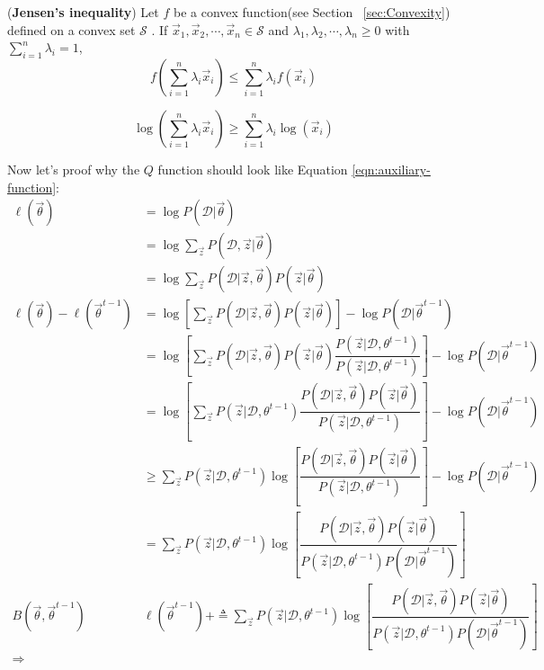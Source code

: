 \begin{theorem}
(\textbf{Jensen's inequality}) Let $f$ be a convex function(see Section ~\ref{sec:Convexity}) defined on a convex set $\mathcal{S}$ . If $\vec{x}_1, \vec{x}_2, \cdots , \vec{x}_n \in \mathcal{S}$ and $\lambda_1, \lambda_2, \cdots , \lambda_n \geq 0$ with $\sum\limits_{i=1}^n \lambda_i=1$,
\begin{equation}
f\left(\sum\limits_{i=1}^n \lambda_i\vec{x}_i\right) \leq \sum\limits_{i=1}^n {\lambda_i f(\vec{x}_i)}
\end{equation}
\end{theorem}

\begin{proposition}
\begin{equation}
\log\left(\sum\limits_{i=1}^n \lambda_i\vec{x}_i\right) \geq \sum\limits_{i=1}^n {\lambda_i \log(\vec{x}_i)}
\end{equation}
\end{proposition}

Now let's proof why the $Q$ function should look like Equation \eqref{eqn:auxiliary-function}:
\begin{align}
\ell(\vec{\theta}) &= \log{P(\mathcal{D}|\vec{\theta})}  \nonumber \\
                &= \log{{\sum\limits_{\vec{z}} P(\mathcal{D},\vec{z}|\vec{\theta})}} \nonumber \\
				&= \log{{\sum\limits_{\vec{z}} P(\mathcal{D}|\vec{z},\vec{\theta})P(\vec{z}|\vec{\theta})}} \nonumber \\
\ell(\vec{\theta})-\ell(\vec{\theta}^{t-1}) &= \log\left[\sum\limits_{\vec{z}} P(\mathcal{D}|\vec{z},\vec{\theta})P(\vec{z}|\vec{\theta})\right] - \log{P(\mathcal{D}|\vec{\theta}^{t-1})} \nonumber \\
                &= \log\left[\sum\limits_{\vec{z}} P(\mathcal{D}|\vec{z},\vec{\theta})P(\vec{z}|\vec{\theta})\dfrac{P(\vec{z}|\mathcal{D},\theta^{t-1})}{P(\vec{z}|\mathcal{D},\theta^{t-1})}\right] - \log{P(\mathcal{D}|\vec{\theta}^{t-1})} \nonumber \\
				&= \log\left[\sum\limits_{\vec{z}} P(\vec{z}|\mathcal{D},\theta^{t-1})\dfrac{P(\mathcal{D}|\vec{z},\vec{\theta})P(\vec{z}|\vec{\theta})}{P(\vec{z}|\mathcal{D},\theta^{t-1})}\right] - \log{P(\mathcal{D}|\vec{\theta}^{t-1})} \nonumber \\
				&\geq \sum\limits_{\vec{z}} P(\vec{z}|\mathcal{D},\theta^{t-1})\log\left[\dfrac{P(\mathcal{D}|\vec{z},\vec{\theta})P(\vec{z}|\vec{\theta})}{P(\vec{z}|\mathcal{D},\theta^{t-1})}\right] - \log{P(\mathcal{D}|\vec{\theta}^{t-1})} \nonumber \\
				&= \sum\limits_{\vec{z}} P(\vec{z}|\mathcal{D},\theta^{t-1})\log\left[\dfrac{P(\mathcal{D}|\vec{z},\vec{\theta})P(\vec{z}|\vec{\theta})}{P(\vec{z}|\mathcal{D},\theta^{t-1})P(\mathcal{D}|\vec{\theta}^{t-1})}\right] \nonumber \\
				B(\vec{\theta},\vec{\theta}^{t-1}) & \ell(\vec{\theta}^{t-1})+\triangleq \sum\limits_{\vec{z}} P(\vec{z}|\mathcal{D},\theta^{t-1})\log\left[\dfrac{P(\mathcal{D}|\vec{z},\vec{\theta})P(\vec{z}|\vec{\theta})}{P(\vec{z}|\mathcal{D},\theta^{t-1})P(\mathcal{D}|\vec{\theta}^{t-1})}\right] \\
\Rightarrow & \nonumber
\end{align}

